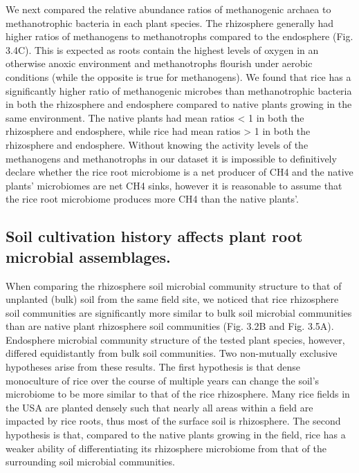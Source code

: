 We next compared the relative abundance ratios of methanogenic archaea to methanotrophic bacteria in each plant species. The rhizosphere generally had higher ratios of methanogens to methanotrophs compared to the endosphere (Fig. 3.4C). This is expected as roots contain the highest levels of oxygen in an otherwise anoxic environment and methanotrophs flourish under aerobic conditions (while the opposite is true for methanogens). We found that rice has a significantly higher ratio of methanogenic microbes than methanotrophic bacteria in both the rhizosphere and endosphere compared to native plants growing in the same environment. The native plants had mean ratios < 1 in both the rhizosphere and endosphere, while rice had mean ratios > 1 in both the rhizosphere and endosphere. Without knowing the activity levels of the methanogens and methanotrophs in our dataset it is impossible to definitively declare whether the rice root microbiome is a net producer of CH4 and the native plants' microbiomes are net CH4 sinks, however it is reasonable to assume that the rice root microbiome produces more CH4 than the native plants'. 

\subsection{Soil cultivation history affects plant root microbial assemblages.}
When comparing the rhizosphere soil microbial community structure to that of unplanted (bulk) soil from the same field site, we noticed that rice rhizosphere soil communities are significantly more similar to bulk soil microbial communities than are native plant rhizosphere soil communities (Fig. 3.2B and Fig. 3.5A). Endosphere microbial community structure of the tested plant species, however, differed equidistantly from bulk soil communities. Two non-mutually exclusive hypotheses arise from these results. The first hypothesis is that dense monoculture of rice over the course of multiple years can change the soil's microbiome to be more similar to that of the rice rhizosphere. Many rice fields in the USA are planted densely such that nearly all areas within a field are impacted by rice roots, thus most of the surface soil is rhizosphere. The second hypothesis is that, compared to the native plants growing in the field, rice has a weaker ability of differentiating its rhizosphere microbiome from that of the surrounding soil microbial communities. 

